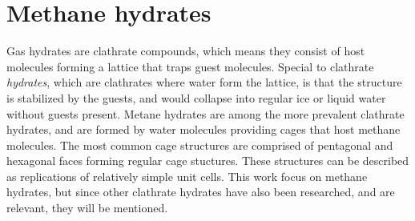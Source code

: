 \chapter{Methane hydrates}
\label{ch:state_of_the_science}
Gas hydrates are clathrate compounds, which means they consist of host molecules forming a lattice that traps guest molecules. Special to clathrate \emph{hydrates}, which are clathrates where water form the lattice, is that the structure is stabilized by the guests, and would collapse into regular ice or liquid water without guests present. Metane hydrates are among the more prevalent clathrate hydrates, and are formed by water molecules providing cages that host methane molecules. The most common cage structures are comprised of pentagonal and hexagonal faces forming regular cage stuctures. These structures can be described as replications of relatively simple unit cells. This work focus on methane hydrates, but since other clathrate hydrates have also been researched, and are relevant, they will be mentioned.

